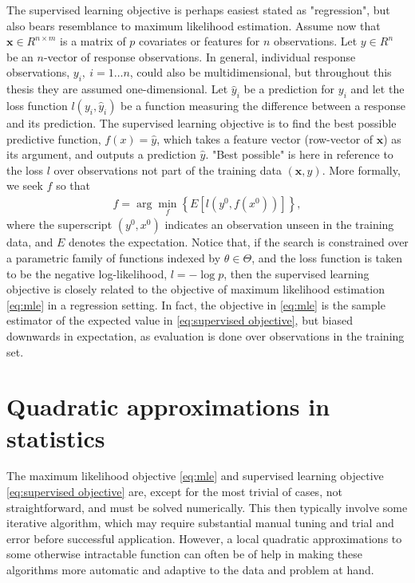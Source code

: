 The supervised learning objective is perhaps easiest stated as "regression", but also bears resemblance to maximum likelihood estimation.
Assume now that $\mathbf{x}\in R^{n\times m}$ is a matrix of $p$ covariates or features for $n$ observations. Let $y\in R^n$ be an $n$-vector of response observations.
In general, individual response observations, $y_i,~i=1\dots n$, could also be multidimensional, but throughout this thesis they are assumed one-dimensional.
Let $\hat{y}_i$ be a prediction for $y_i$ and let the loss function $l(y_i,\hat{y}_i)$ be a function measuring the difference between a response and its prediction.
The supervised learning objective is to find the best possible predictive function, $f(x)=\hat{y}$, which takes a feature vector (row-vector of $\mathbf{x}$) as its argument, and outputs a prediction $\hat{y}$. "Best possible" is here in reference to the loss $l$ over observations not part of the training data $(\mathbf{x},y)$.
More formally, we seek $f$ so that
\begin{align}\label{eq:supervised objective}
	\hat{f} = \arg\min_f \left\{ E\left[l(y^0, f(x^0))\right] \right\},
\end{align} 
where the superscript $(y^0, x^0)$ indicates an observation unseen in the training data, and $E$ denotes the expectation.
Notice that, if the search is constrained over a parametric family of functions indexed by $\theta\in\Theta$, and the loss function is taken to be the negative log-likelihood, $l=-\log p$, then the supervised learning objective is closely related to the objective of maximum likelihood estimation \eqref{eq:mle} in a regression setting.
In fact, the objective in \eqref{eq:mle} is the sample estimator of the expected value in \eqref{eq:supervised objective}, but biased downwards in expectation, as evaluation is done over observations in the training set.


\chapter{Quadratic approximations in statistics} 


The maximum likelihood objective \eqref{eq:mle} and supervised learning objective \eqref{eq:supervised objective} are, except for the most trivial of cases, not straightforward, and must be solved numerically.
This then typically involve some iterative algorithm, which may require substantial manual tuning and trial and error before successful application. 
However, a local quadratic approximations to some otherwise intractable function can often be of help in making these algorithms more automatic and adaptive to the data and problem at hand.

